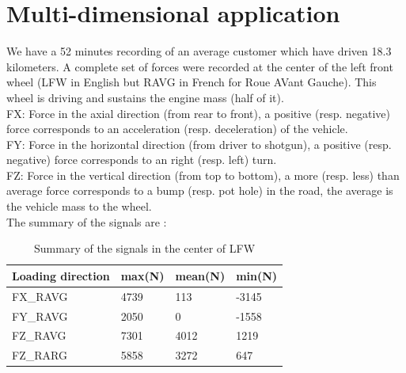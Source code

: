 \documentclass[3p,times,procedia,number]{elsarticle}
\begin{document}
\section{Multi-dimensional application}

We have a 52 minutes recording of an average customer which have driven 18.3 kilometers. A complete set of forces were recorded at the center of the left front wheel (LFW in English but RAVG in French for Roue AVant Gauche). This wheel is driving and sustains the engine mass (half of it).\\
FX: Force in the axial direction (from rear to front), a positive (resp. negative) force corresponds to an acceleration (resp. deceleration) of the vehicle.\\
FY: Force in the horizontal direction (from driver to shotgun), a positive (resp. negative) force corresponds to an right (resp. left) turn.\\
FZ: Force in the vertical direction (from top to bottom), a more (resp. less) than average force corresponds to a bump (resp. pot hole) in the road, the average is the vehicle mass to the wheel.\\

The summary of the signals are :
\begin{table}[]
	\centering
	\begin{tabular}{llll}
		\hline
		\multicolumn{1}{c}{\textbf{Loading direction}} & \multicolumn{1}{c}{\textbf{max(N)}} & \multicolumn{1}{c}{\textbf{mean(N)}} & \multicolumn{1}{c}{\textbf{min(N)}} \\ \hline
		FX\_RAVG                                       & 4739                                & 113                                  & -3145                               \\
		FY\_RAVG                                       & 2050                                & 0                                    & -1558                               \\
		FZ\_RAVG                                       & 7301       & 4012                                 & 1219                                \\
		FZ\_RARG                                       & 5858                                & 3272                                 & 647                                 \\ \hline
	\end{tabular}
	\caption{Summary of the signals in the center of LFW}
	\label{data}
\end{table}
\end{document}
